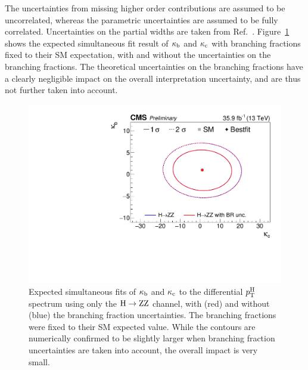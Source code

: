 The uncertainties from missing higher order contributions are assumed to be uncorrelated, whereas the parametric uncertainties are assumed to be fully correlated.
% 
Uncertainties on the partial widths are taken from Ref.~\cite{deFlorian:2016spz}.
% 
Figure~\ref{fig:kbkc-brcomparison} shows the expected simultaneous fit result of $\kappa_{\mathrm{b}}$ and $\kappa_{\mathrm{c}}$ with branching fractions fixed to their SM expectation, with and without the uncertainties on the branching fractions.
% 
The theoretical uncertainties on the branching fractions have a clearly negligible impact on the overall interpretation uncertainty, and are thus not further taken into account.


\begin{figure}[hbtp]
  \begin{center}
    \includegraphics[width=\halflinewidth]{img/interpretation/other/multicont_Yukawa_compareBRuncertainties_asimov.pdf}
    \caption{
        Expected simultaneous fits of $\kappa_{\mathrm{b}}$ and $\kappa_{\mathrm{c}}$ to the differential $p_\mathrm{T}^\mathrm{H}$ spectrum using only the $\mathrm{H}\to\mathrm{Z}\mathrm{Z}$ channel, with (red) and without (blue) the branching fraction uncertainties.
        The branching fractions were fixed to their SM expected value.
        While the contours are numerically confirmed to be slightly larger when branching fraction uncertainties are taken into account, the overall impact is very small.
        }
    \label{fig:kbkc-brcomparison}
  \end{center}
\end{figure}

